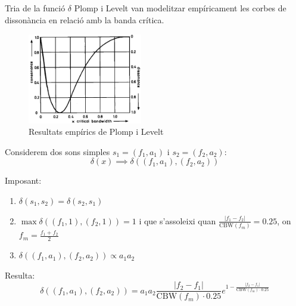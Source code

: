 \documentclass[10pt,hyperref={colorlinks,linkcolor=black,citecolor=blue!80,urlcolor=blue!60}]{beamer} %
\theoremstyle{definition}
\newcommand{\0}{\ensuremath{\vb{0}}}
\begin{document}
\begin{frame}{Tria de la funció $\delta$}
    Plomp i Levelt \cite{plomp} van modelitzar empíricament les corbes de dissonància en relació amb la banda crítica.
    \begin{figure}
        \centering
        \includegraphics[width=5cm,angle=-0.1]{Imatges_beamer3/plompt-levelt.png}
        \caption{Resultats empírics de Plomp i Levelt \cite{plomp}}
    \end{figure}
    \hypersetup{citecolor=black!30}
    \hypersetup{citecolor=blue!80}
\end{frame}
\begin{frame}{}
    Considerem dos sons simples $s_1=(f_1,a_1)$ i $s_2=(f_2,a_2)$:\pause
    $$\delta(x)\implies\delta((f_1,a_1),(f_2,a_2))$$\par\pause\vspace{-0.1cm}
    Imposant:
    \begin{enumerate}
        \item $\delta(s_1,s_2)=\delta(s_2,s_1)$\pause
        \item $\max\delta((f_1,1),(f_2,1))=1$ i que s'assoleixi quan $\frac{|f_1-f_2|}{\text{CBW}(f_m)}=0.25$, on $f_m=\frac{f_1+f_2}{2}$\pause
        \item $\delta((f_1,a_1),(f_2,a_2))\propto a_1a_2$\pause
    \end{enumerate}
    Resulta:
    \begin{equation*}
        \delta((f_1,a_1),(f_2,a_2))=a_1a_2\frac{|f_2-f_1|}{\text{CBW}(f_m)\cdot 0.25}e^{1-\frac{|f_2-f_1|}{\text{CBW}(f_m)\cdot 0.25}}
    \end{equation*}\vspace{-0.2cm}
    \begin{figure}
        \centering
        
    \end{figure}
\end{frame}
\end{document}
